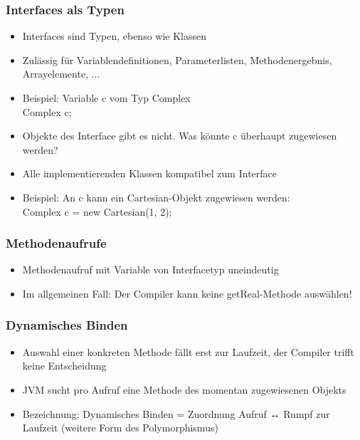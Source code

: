 \subsubsection{Interfaces als Typen}
\begin{itemize}
\item Interfaces sind Typen, ebenso wie Klassen
\item Zulässig für Variablendefinitionen, Parameterlisten, Methodenergebnis, Arrayelemente, ...
\item Beispiel: Variable c vom Typ Complex\\
Complex c;
\item Objekte des Interface gibt es nicht. Was könnte c überhaupt zugewiesen werden?
\item Alle implementierenden Klassen kompatibel zum Interface
\item Beispiel: An c kann ein Cartesian-Objekt zugewiesen werden:\\
Complex c = new Cartesian(1, 2);
\end{itemize}

\subsubsection{Methodenaufrufe}
\begin{itemize}
\item Methodenaufruf mit Variable von Interfacetyp uneindeutig
\item Im allgemeinen Fall: Der Compiler kann keine getReal-Methode auswählen!
\end{itemize}

\subsubsection{Dynamisches Binden}
\begin{itemize}
\item Auswahl einer konkreten Methode fällt erst zur Laufzeit, der Compiler trifft keine Entscheidung
\item JVM sucht pro Aufruf eine Methode des momentan zugewiesenen Objekts
\item Bezeichnung: Dynamisches Binden = Zuordnung Aufruf ↔ Rumpf zur Laufzeit (weitere Form des Polymorphismus)
\end{itemize}

